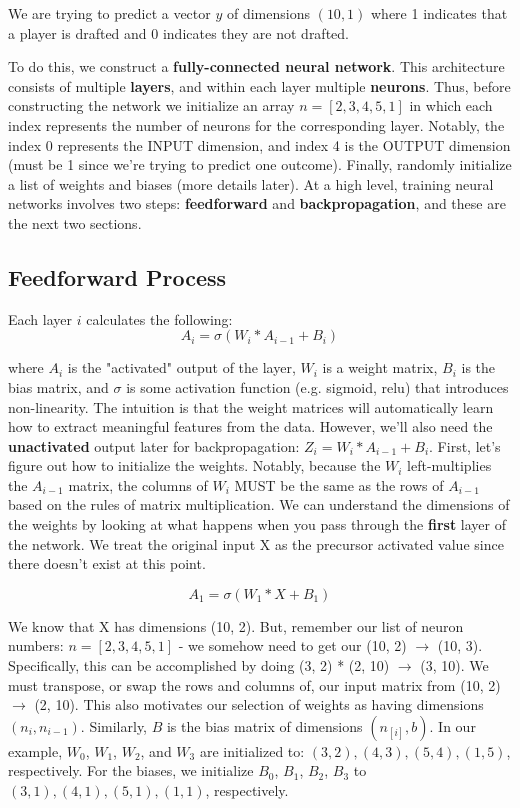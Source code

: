\documentclass[12pt]{article}
\begin{document}
We are trying to predict a vector $y$ of dimensions $(10, 1)$ where 1 indicates that a player is drafted and 0 indicates they are not drafted. 

To do this, we construct a \textbf{fully-connected neural network}. This architecture consists of multiple \textbf{layers}, and within each layer multiple \textbf{neurons}. Thus, before constructing the network we initialize an array $n = [2, 3, 4, 5, 1]$ in which each index represents the number of neurons for the corresponding layer. Notably, the index 0 represents the INPUT dimension, and index 4 is the OUTPUT dimension (must be 1 since we’re trying to predict one outcome). Finally, randomly initialize a list of weights and biases (more details later). At a high level, training neural networks involves two steps: \textbf{feedforward} and \textbf{backpropagation}, and these are the next two sections. 


\subsection{Feedforward Process}

Each layer $i$ calculates the following:
\[A_i = \sigma(W_i * A_{i-1} + B_i)\]

where $A_i$ is the "activated" output of the layer, $W_i$ is a weight matrix, $B_i$ is the bias matrix, and $\sigma$ is some activation function (e.g. sigmoid, relu) that introduces non-linearity. The intuition is that the weight matrices will automatically learn how to extract meaningful features from the data. However, we'll also need the \textbf{unactivated} output later for backpropagation: $Z_i = W_i * A_{i-1} + B_i$. First, let's figure out how to initialize the weights. Notably, because the $W_i$ left-multiplies the $A_{i-1}$ matrix, the columns of $W_i$ MUST be the same as the rows of $A_{i-1}$ based on the rules of matrix multiplication. We can understand the dimensions of the weights by looking at what happens when you pass through the \textbf{first} layer of the network. We treat the original input X as the precursor activated value since there doesn't exist at this point. 

\[A_1 = \sigma(W_1 * X + B_1)\]

We know that X has dimensions (10, 2). But, remember our list of neuron numbers: $n = [2, 3, 4, 5, 1]$ - we somehow need to get our (10, 2) $\rightarrow$ (10, 3). Specifically, this can be accomplished by doing (3, 2) * (2, 10) $\rightarrow$ (3, 10). We must transpose, or swap the rows and columns of, our input matrix from (10, 2) $\rightarrow$ (2, 10). This also motivates our selection of weights as having dimensions $(n_{i}, n_{i-1})$. Similarly, $B$ is the bias matrix of dimensions $(n_{[i]}, b)$. In our example, $W_0$, $W_1$, $W_2$, and $W_3$ are initialized to: $(3, 2), (4, 3), (5, 4), (1, 5)$, respectively. For the biases, we initialize $B_0$, $B_1$, $B_2$, $B_3$ to $(3, 1), (4, 1), (5, 1), (1, 1)$, respectively.
\end{document}
